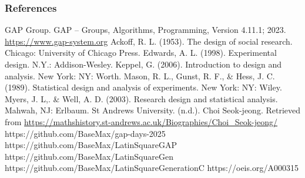 \documentclass{beamer}
\begin{document}
\begin{frame}[allowframebreaks]
\frametitle{References}
\begin{thebibliography}{99}
 GAP Group. GAP -- Groups, Algorithms, Programming, Version 4.11.1; 2023. \url{https://www.gap-system.org}
 Ackoff, R. L. (1953). The design of social research. Chicago: University of Chicago Press.
 Edwards, A. L. (1998). Experimental design. N.Y.: Addison-Wesley.
 Keppel, G. (2006). Introduction to design and analysis. New York: NY: Worth.
 Mason, R. L., Gunst, R. F., \& Hess, J. C. (1989). Statistical design and analysis of experiments. New York: NY: Wiley.
 Myers, J. L,. \& Well, A. D. (2003). Research design and statistical analysis. Mahwah, NJ: Erlbaum.
 St Andrews University. (n.d.). Choi Seok-jeong. Retrieved from \url{https://mathshistory.st-andrews.ac.uk/Biographies/Choi_Seok-jeong/}
 https://github.com/BaseMax/gap-days-2025
 https://github.com/BaseMax/LatinSquareGAP
 https://github.com/BaseMax/LatinSquareGen
 https://github.com/BaseMax/LatinSquareGenerationC
 https://oeis.org/A000315
\end{thebibliography}
\end{frame}
\end{document}
